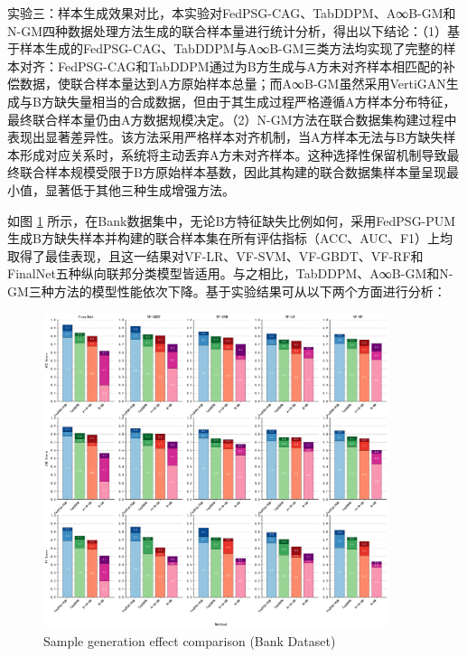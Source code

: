 实验三：样本生成效果对比，本实验对FedPSG-CAG、TabDDPM、A∞B-GM和N-GM四种数据处理方法生成的联合样本量进行统计分析，得出以下结论：（1）基于样本生成的FedPSG-CAG、TabDDPM与A∞B-GM三类方法均实现了完整的样本对齐：FedPSG-CAG和TabDDPM通过为B方生成与A方未对齐样本相匹配的补偿数据，使联合样本量达到A方原始样本总量；而A∞B-GM虽然采用VertiGAN生成与B方缺失量相当的合成数据，但由于其生成过程严格遵循A方样本分布特征，最终联合样本量仍由A方数据规模决定。（2）N-GM方法在联合数据集构建过程中表现出显著差异性。该方法采用严格样本对齐机制，当A方样本无法与B方缺失样本形成对应关系时，系统将主动丢弃A方未对齐样本。这种选择性保留机制导致最终联合样本规模受限于B方原始样本基数，因此其构建的联合数据集样本量呈现最小值，显著低于其他三种生成增强方法。

如图 \ref{Chapter4Exp3Bank} 所示，在Bank数据集中，无论B方特征缺失比例如何，采用FedPSG-PUM生成B方缺失样本并构建的联合样本集在所有评估指标（ACC、AUC、F1）上均取得了最佳表现，且这一结果对VF-LR、VF-SVM、VF-GBDT、VF-RF和FinalNet五种纵向联邦分类模型皆适用。与之相比，TabDDPM、A∞B-GM和N-GM三种方法的模型性能依次下降。基于实验结果可从以下两个方面进行分析：

\vspace{-0.1cm}
\begin{figure}[H]
	\centering
	\includegraphics[width=0.9\textwidth]{chapters/imgs/Chapter4Exp3Bank}
	{\wuhao Sample generation effect comparison (Bank Dataset)}
	\label{Chapter4Exp3Bank}
\end{figure}
\vspace{-0.5cm}

